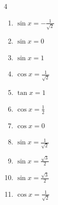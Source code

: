 \begin{multicols}{4}
\begin{enumerate}

  \item $\displaystyle \sin{x}  = -\frac{1}{\sqrt{2}}$


  \item $\displaystyle \sin{x}  = 0$


  \item $\displaystyle \sin{x}  = 1$


  \item $\displaystyle \cos{x}  = \frac{1}{\sqrt{2}}$


  \item $\displaystyle \tan{x}  = 1$


  \item $\displaystyle \cos{x}  = \frac{1}{2}$


  \item $\displaystyle \cos{x}  = 0$


  \item $\displaystyle \sin{x}  = \frac{1}{\sqrt{2}}$


\columnbreak %

  \item $\displaystyle \sin{x}  = \frac{\sqrt{3}}{2}$


  \item $\displaystyle \sin{x}  = \frac{\sqrt{3}}{2}$


  \item $\displaystyle \cos{x}  = \frac{1}{\sqrt{2}}$


\end{enumerate}
\end{multicols}
